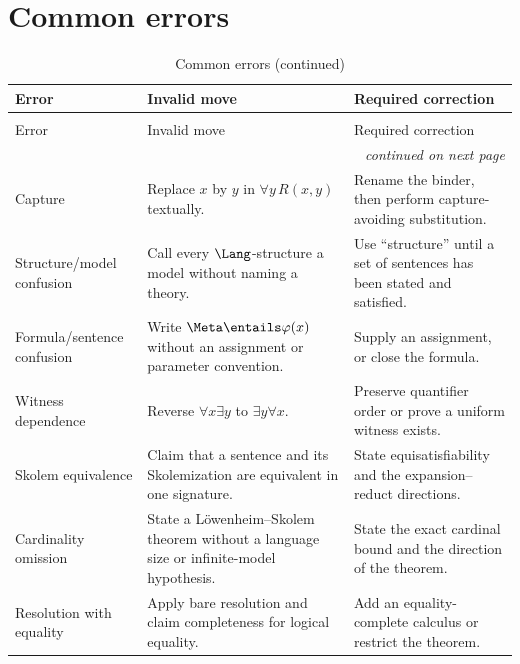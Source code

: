 \section{Common errors}
\label{sec:fol-cardinality-normalforms-05}

\begin{longtable}{@{}p{}p{}p{}@{}}
\caption{Common errors}\\
\toprule
Error & Invalid move & Required correction \\ \midrule
\endfirsthead
\caption[]{Common errors (continued)}\\
\toprule
Error & Invalid move & Required correction \\ \midrule
\endhead
\midrule\multicolumn{3}{r}{\emph{continued on next page}}\\
\endfoot
\endlastfoot
Capture & Replace \(x\) by \(y\) in \(\forall y\,R(x,y)\) textually. &
Rename the binder, then perform capture-avoiding substitution. \\
\addlinespace
Structure/model confusion & Call every \(\Lang\)-structure a model without
naming a theory. & Use ``structure'' until a set of sentences has been stated
and satisfied. \\
\addlinespace
Formula/sentence confusion & Write \(\Meta\entails\varphi(x)\) without an
assignment or parameter convention. & Supply an assignment, or close the
formula. \\
\addlinespace
Witness dependence & Reverse \(\forall x\exists y\) to
\(\exists y\forall x\). & Preserve quantifier order or prove a uniform witness
exists. \\
\addlinespace
Skolem equivalence & Claim that a sentence and its Skolemization are
equivalent in one signature. & State equisatisfiability and the
expansion--reduct directions. \\
\addlinespace
Cardinality omission & State a L\"owenheim--Skolem theorem without a language
size or infinite-model hypothesis. & State the exact cardinal bound and the
direction of the theorem. \\
\addlinespace
Resolution with equality & Apply bare resolution and claim completeness for
logical equality. & Add an equality-complete calculus or restrict the theorem.
\\
\bottomrule
\end{longtable}

